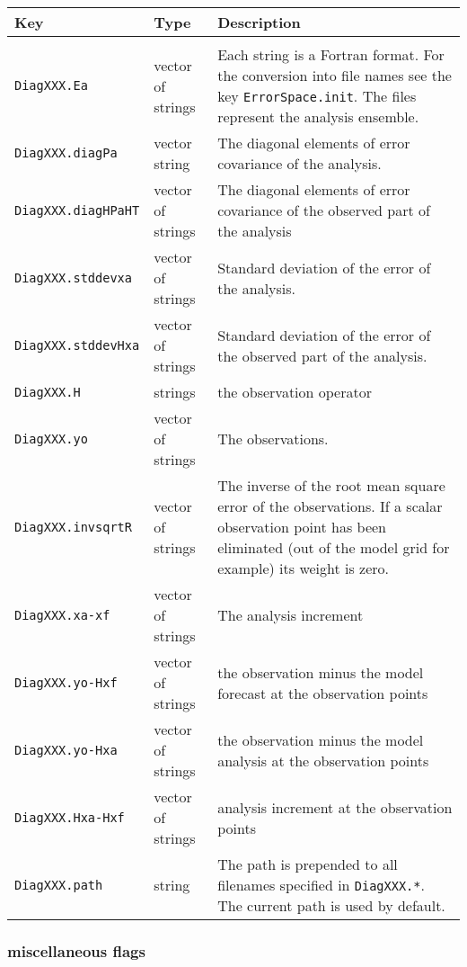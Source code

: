 \documentclass[a4paper,12pt]{article}
\newcommand{\code}{\texttt}
\newenvironment{keytabular}{\begin{tabular}{|p{0.3\textwidth}|p{0.2\textwidth}|p{0.5\textwidth}|} \hline Key & Type & Description \\ \hline \hline }{\end{tabular}}
\begin{document}
\begin{keytabular}
\\
\code{DiagXXX.Ea} & vector of strings & Each string is a Fortran
format. For the conversion into file names see the key
\code{ErrorSpace.init}. The files represent
the analysis ensemble.
\\
\code{DiagXXX.diagPa} & vector string & The diagonal elements of error
covariance of the analysis.
\\
\code{DiagXXX.diagHPaHT} & vector of strings & The diagonal elements of error
covariance of the observed part of the analysis 
\\
\code{DiagXXX.stddevxa} & vector of strings & Standard deviation of
the error of the analysis.
\\
\code{DiagXXX.stddevHxa} & vector of strings & Standard deviation of
the error of the observed part of the analysis.
\\
\hline
\code{DiagXXX.H} & strings & the observation operator
\\
\code{DiagXXX.yo} & vector of strings & The observations.
\\
\code{DiagXXX.invsqrtR} & vector of strings & The inverse of the root mean
square error of the observations. If a scalar observation point has
been eliminated (out of the model grid for example) its weight is zero.
\\
\code{DiagXXX.xa-xf} & vector of strings & The analysis increment
\\
\code{DiagXXX.yo-Hxf} & vector of strings & the observation minus the
model forecast at the observation points
\\
\code{DiagXXX.yo-Hxa} & vector of strings & the observation minus the
model analysis at the observation points
\\
\code{DiagXXX.Hxa-Hxf} & vector of strings & analysis increment 
at the observation points
\\
\code{DiagXXX.path} & string & The path is prepended to all filenames
specified in \code{DiagXXX.*}. The current path is used by default.
\\
\hline
\end{keytabular}

\subsubsection{miscellaneous flags}
\end{document}

